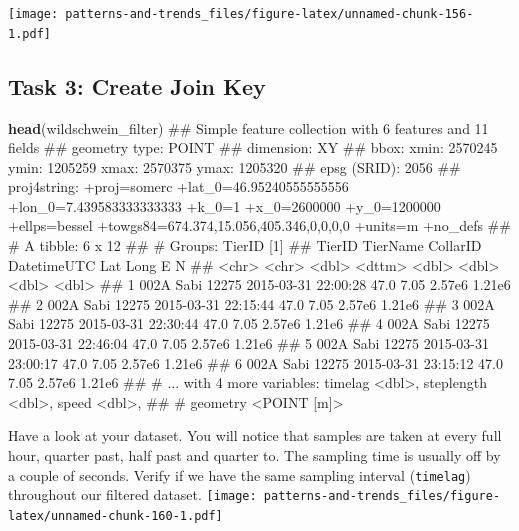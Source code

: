\documentclass[]{book}
\newenvironment{Shaded}{\begin{snugshade}}{\end{snugshade}}
\newcommand{\KeywordTok}[1]{\textcolor[rgb]{0.13,0.29,0.53}{\textbf{#1}}}
\newcommand{\StringTok}[1]{\textcolor[rgb]{0.31,0.60,0.02}{#1}}
\newcommand{\OperatorTok}[1]{\textcolor[rgb]{0.81,0.36,0.00}{\textbf{#1}}}
\newcommand{\NormalTok}[1]{#1}
\begin{document}
\texttt{[image: patterns-and-trends\_files/figure-latex/unnamed-chunk-156-1.pdf]}

\begin{Shaded}
\end{Shaded}

\subsection{Task 3: Create Join Key}\label{task-3-create-join-key}

\begin{Shaded}
\begin{Highlighting}[]
\KeywordTok{head}\NormalTok{(wildschwein_filter)}
\NormalTok{## Simple feature collection with 6 features and 11 fields}
\NormalTok{## geometry type:  POINT}
\NormalTok{## dimension:      XY}
\NormalTok{## bbox:           xmin: 2570245 ymin: 1205259 xmax: 2570375 ymax: 1205320}
\NormalTok{## epsg (SRID):    2056}
\NormalTok{## proj4string:    +proj=somerc +lat_0=46.95240555555556 +lon_0=7.439583333333333 +k_0=1 +x_0=2600000 +y_0=1200000 +ellps=bessel +towgs84=674.374,15.056,405.346,0,0,0,0 +units=m +no_defs}
\NormalTok{## # A tibble: 6 x 12}
\NormalTok{## # Groups:   TierID [1]}
\NormalTok{##   TierID TierName CollarID DatetimeUTC           Lat  Long      E      N}
\NormalTok{##   <chr>  <chr>       <dbl> <dttm>              <dbl> <dbl>  <dbl>  <dbl>}
\NormalTok{## 1 002A   Sabi        12275 2015-03-31 22:00:28  47.0  7.05 2.57e6 1.21e6}
\NormalTok{## 2 002A   Sabi        12275 2015-03-31 22:15:44  47.0  7.05 2.57e6 1.21e6}
\NormalTok{## 3 002A   Sabi        12275 2015-03-31 22:30:44  47.0  7.05 2.57e6 1.21e6}
\NormalTok{## 4 002A   Sabi        12275 2015-03-31 22:46:04  47.0  7.05 2.57e6 1.21e6}
\NormalTok{## 5 002A   Sabi        12275 2015-03-31 23:00:17  47.0  7.05 2.57e6 1.21e6}
\NormalTok{## 6 002A   Sabi        12275 2015-03-31 23:15:12  47.0  7.05 2.57e6 1.21e6}
\NormalTok{## # ... with 4 more variables: timelag <dbl>, steplength <dbl>, speed <dbl>,}
\NormalTok{## #   geometry <POINT [m]>}
\end{Highlighting}
\end{Shaded}

Have a look at your dataset. You will notice that samples are taken at
every full hour, quarter past, half past and quarter to. The sampling
time is usually off by a couple of seconds. Verify if we have the same
sampling interval (\texttt{timelag}) throughout our filtered dataset.
\texttt{[image: patterns-and-trends\_files/figure-latex/unnamed-chunk-160-1.pdf]}
\end{document}
